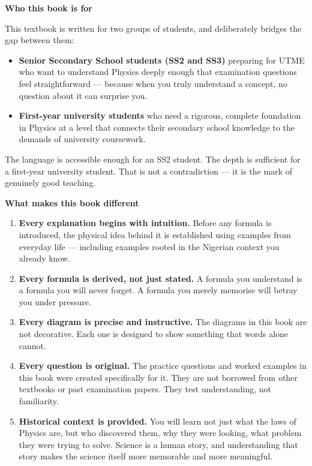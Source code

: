 \textbf{Who this book is for}

\vspace{0.3cm}

This textbook is written for two groups of students, and
deliberately bridges the gap between them:

\begin{itemize}
  \item \textbf{Senior Secondary School students (SS2 and SS3)}
  preparing for UTME who want to understand Physics deeply
  enough that examination questions feel straightforward ---
  because when you truly understand a concept, no question
  about it can surprise you.

  \item \textbf{First-year university students} who need a
  rigorous, complete foundation in Physics at a level that
  connects their secondary school knowledge to the demands of
  university coursework.
\end{itemize}

The language is accessible enough for an SS2 student. The
depth is sufficient for a first-year university student. That
is not a contradiction --- it is the mark of genuinely good
teaching.

\vspace{0.5cm}

\textbf{What makes this book different}

\vspace{0.3cm}

\begin{enumerate}
  \item \textbf{Every explanation begins with intuition.}
  Before any formula is introduced, the physical idea behind
  it is established using examples from everyday life ---
  including examples rooted in the Nigerian context you
  already know.

  \item \textbf{Every formula is derived, not just stated.}
  A formula you understand is a formula you will never forget.
  A formula you merely memorise will betray you under pressure.

  \item \textbf{Every diagram is precise and instructive.}
  The diagrams in this book are not decorative. Each one is
  designed to show something that words alone cannot.

  \item \textbf{Every question is original.}
  The practice questions and worked examples in this book were
  created specifically for it. They are not borrowed from
  other textbooks or past examination papers. They test
  understanding, not familiarity.

  \item \textbf{Historical context is provided.}
  You will learn not just what the laws of Physics are, but
  who discovered them, why they were looking, what problem
  they were trying to solve. Science is a human story, and
  understanding that story makes the science itself more
  memorable and more meaningful.
\end{enumerate}

